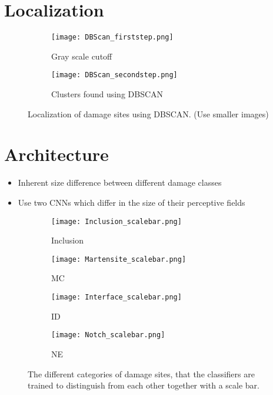 \documentclass[10pt,a4paper]{report}
\begin{document}
\chapter{Localization}

\begin{figure}
\begin{subfigure}{.5\textwidth}
\centering
  \texttt{[image: DBScan\_firststep.png]}
  \caption{Gray scale cutoff}
  \label{fig:Inclusion_scalebar}
\end{subfigure}
\begin{subfigure}{.5\textwidth}
\centering
  \texttt{[image: DBScan\_secondstep.png]}
  \caption{Clusters found using DBSCAN}
  \label{fig:Inclusion_scalebar}
\end{subfigure}
\caption{Localization of damage sites using DBSCAN. (Use smaller images)}
\end{figure}

\chapter{Architecture}
\begin{itemize}
\item Inherent size difference between different damage classes
\item Use two CNNs which differ in the size of their perceptive fields
\end{itemize}

\begin{figure}
\centering
\begin{subfigure}{.25\textwidth}
\centering
  \texttt{[image: Inclusion\_scalebar.png]}
  \caption{Inclusion}
  \label{fig:Inclusion_scalebar}
\end{subfigure}%
\begin{subfigure}{.25\textwidth}
\centering
  \texttt{[image: Martensite\_scalebar.png]}
  \caption{MC}
  \label{fig:Martensite_scalebar}
\end{subfigure}%
\begin{subfigure}{.25\textwidth}
\centering
  \texttt{[image: Interface\_scalebar.png]}
  \caption{ID}
  \label{fig:Interface_scalebar}
\end{subfigure}%
\begin{subfigure}{.25\textwidth}
\centering
  \texttt{[image: Notch\_scalebar.png]}
  \caption{NE}
  \label{fig:Notch_scalebar}
\end{subfigure}%
\caption{The different categories of damage sites, that the classifiers are trained to distinguish from each other together with a scale bar.}
\label{fig:SizeDifference}
\end{figure}
\end{document}
